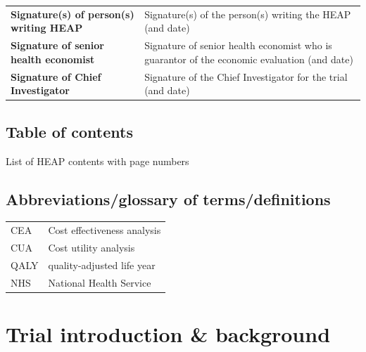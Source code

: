\begin{table}
\begin{tabular}{ll}
    \\
    \textbf{Signature(s) of person(s) writing HEAP} &
                                                      Signature(s) of the person(s) writing the HEAP (and date)
    \\
    \textbf{Signature of senior health economist} &
                                                    Signature of senior health economist who is guarantor of the economic evaluation (and date)
    \\
    \textbf{Signature of Chief Investigator} &
                                               Signature of the Chief Investigator for the trial (and date)
    \\
    \hline
  \end{tabular}
\end{table}

\subsection*{Table  of contents}

List of HEAP contents with page numbers

\subsection*{Abbreviations/glossary of terms/definitions}

\begin{table}
  \centering
  \begin{tabular}{ll}
    \hline
    CEA & Cost effectiveness analysis \\
    CUA & Cost utility analysis \\
    QALY & quality-adjusted life year \\
    NHS & National Health Service \\
    \hline
  \end{tabular}
\end{table}



\section{Trial introduction \& background}

